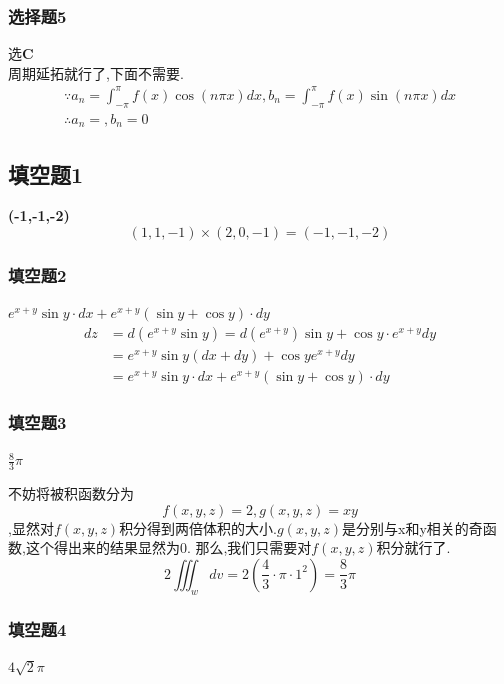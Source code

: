 \documentclass[a4paper,12pt]{ctexrep}
\begin{document}
\subsubsection{选择题5}
选\textbf{C} \\
周期延拓就行了,下面不需要.
\begin{equation*}
\begin{aligned}
\because a_{n}=\int_{-\pi}^{\pi}f(x)\cos(n\pi x)dx,b_{n}=\int_{-\pi}^{\pi}f(x)\sin(n\pi x)dx \\
\therefore 
a_{n}=,
b_{n}=0
\end{aligned}
\end{equation*}

\newpage

\subsection{填空题1}
\textbf{(-1,-1,-2)}
\begin{equation*}
(1,1,-1)\times(2,0,-1) =(-1,-1,-2)
\end{equation*}

\subsubsection{填空题2}
\textbf{$e^{x+y}\sin y \cdot dx + e^{x+y} (\sin y + \cos y ) \cdot dy$}
\begin{equation*}
\begin{aligned}dz&=d(e^{x+y}\sin y)=d(e^{x+y})\sin y+\cos y\cdot e^{x+y}dy\\&
=e^{x+y}\sin y(dx+dy)+\cos ye^{x+y}dy\\&
=e^{x+y}\sin y \cdot dx + e^{x+y} (\sin y + \cos y ) \cdot dy
\end{aligned}
\end{equation*}

\subsubsection{填空题3}
\textbf{$\frac{8}{3}\pi$}

不妨将被积函数分为$$f(x,y,z)=2,g(x,y,z)=xy$$,显然对$f(x,y,z)$积分得到两倍体积的大小.$g(x,y,z)$是分别与x和y相关的奇函数,这个得出来的结果显然为0.
那么,我们只需要对$f(x,y,z)$积分就行了.
\begin{equation*}{2\iiint_{w}dv=2(\frac{4}{3}\cdot\pi\cdot 1^{2})=\frac{8}{3}\pi }\end{equation*}

\subsubsection{填空题4}
\textbf{$4 \sqrt{2} \pi $}
\end{document}
